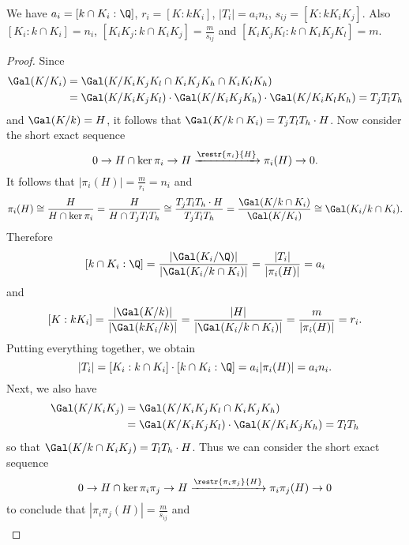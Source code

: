 \begin{prop}\label{degrees}
We have $a_i=[k\cap K_i:\Q]$, $r_i=[K:kK_i]$, $|T_i|=a_in_i$,  $s_{ij}=[K:kK_iK_j]$. Also $[K_i:k\cap K_i]=n_i$, $[K_iK_j:k\cap K_iK_j]=\frac{m}{s_{ij}}$ and $[K_iK_jK_l:k\cap K_iK_jK_l]=m$.
\end{prop}
\begin{proof}
Since
\begin{equation*}
\begin{split}
\Gal(K/K_i)&=\Gal(K/K_iK_jK_l\cap K_iK_jK_h\cap K_iK_lK_h)\\
&=\Gal(K/K_iK_jK_l)\cdot \Gal(K/K_iK_jK_h)\cdot \Gal(K/K_iK_lK_h)
= T_jT_lT_h
\end{split}
\end{equation*} 
 and $\Gal(K/k)=H$, it follows that $\Gal(K/k\cap K_i)= T_jT_lT_h\cdot H$. Now consider the short exact sequence %
$$0\to H\cap \ker \pi_i\to H \xrightarrow{\restr{\pi_i}{H}} \pi_i(H)\to 0.$$
It follows that $|\pi_i(H)|=\frac{m}{r_i}=n_i$ and $$\pi_i(H)\cong \frac{H}{H\cap \ker \pi_i}=\frac{H}{H\cap T_jT_lT_h}\cong \frac{T_jT_lT_h\cdot H}{T_jT_lT_h}= \frac{\Gal(K/k\cap K_i)}{\Gal(K/K_i)}\cong \Gal(K_i/k\cap K_i).$$
Therefore 
$$[k\cap K_i:\Q]=\frac{|\Gal(K_i/\Q)|}{|\Gal(K_i/k\cap K_i)|}=\frac{|T_i|}{|\pi_i(H)|}=a_i$$
and
$$[K:kK_i]=\frac{|\Gal(K/k)|}{|\Gal(kK_i/k)|}=\frac{|H|}{|\Gal(K_i/k\cap K_i)|}=\frac{m}{|\pi_i(H)|}=r_i.$$
Putting everything together, we obtain $$|T_i|=[K_i:k\cap K_i]\cdot[k\cap K_i:\Q]=a_i|\pi_i(H)|=a_in_i.$$
Next, we also have 
\begin{equation*}
\begin{split}
\Gal(K/K_iK_j)&=\Gal(K/K_iK_jK_l\cap K_iK_jK_h)\\
&=\Gal(K/K_iK_jK_l)\cdot \Gal(K/K_iK_jK_h)= T_lT_h
\end{split}
\end{equation*} 
so that $\Gal(K/k\cap K_iK_j)=T_lT_h\cdot H$. Thus we can consider the short exact sequence 
$$0\to H\cap \ker \pi_i\pi_j\to H \xrightarrow{\restr{\pi_i\pi_j}{H}} \pi_i\pi_j(H)\to 0$$
to conclude that $|\pi_i\pi_j(H)|=\frac{m}{s_{ij}}$ and 
\begin{equation*}
\begin{split}

\end{split}
\end{equation*}
\end{proof}
